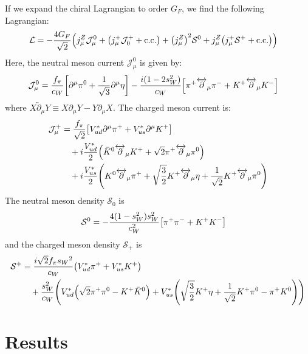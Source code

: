 \documentclass[a4paper,11pt]{article} \pdfoutput=1
\newcommand{\cL}{\mathcal{L}}
\newcommand{\cJ}{\mathcal{J}}
\newcommand{\cS}{\mathcal{S}}
\newcommand{\cw}{{c_{W}}}
\newcommand{\sw}{{s_{W}}}
\newcommand{\fpi}{{f_{\pi}}}
\newcommand{\gf}{{G_{F}}}
\newcommand{\vudc}{{V^{*}_{ud}}}
\newcommand{\vusc}{{V^{*}_{us}}}
\newcommand{\pip}{{\pi^{+}}}
\newcommand{\kp}{{K^{+}}}
\begin{document}
If we expand the chiral Lagrangian to order \(\gf\), we find the following Lagrangian:
\begin{align}
	\cL & =
	-\frac{4G_{F}}{\sqrt{2}}\qty(
	j^{Z}_{\mu}\cJ^{0}_{\mu}
	+ \qty(j^{+}_{\mu}\cJ^{+}_{0} + \mathrm{c.c.})
	+\qty(j^{Z}_{\mu})^{2}\cS^{0}
	+j^{Z}_{\mu}\qty(j^{+}_{\mu}\cS^{+}+\mathrm{c.c.})
	)
\end{align}
Here, the neutral meson current \(\cJ^{0}_{\mu}\) is given by:
\begin{align}
	\cJ^{0}_{\mu} & =
	\frac{f_{\pi}}{c_{W}}\qty[
		\partial^{\mu}\pi^{0}
		+ \frac{1}{\sqrt{3}}
		\partial^{\mu}\eta
	]
	- \frac{i (1-2s_{W}^{2})}{c_{W}}
	\qty[
	\pi^{+}\overleftrightarrow{\partial}_{\mu}\pi^{-} +
	K^{+}\overleftrightarrow{\partial}_{\mu}K^{-}
	]
\end{align}
where \(X\overleftrightarrow{\partial}_{\mu}Y \equiv X\partial_{\mu}Y - Y\partial_{\mu}X\).
The charged meson current is:
\begin{align}
	\cJ^{+}_{\mu}
	 & =
	\frac{f_{\pi}}{\sqrt{2}}\qty[
	V^{*}_{ud}\partial^{\mu}\pi^{+}
	+ V^{*}_{us}\partial^{\mu}K^{+}
	]
	\\
	 & \quad
	+ i
	\frac{V^{*}_{ud}}{2}\qty(
	\bar{K}^{0}\overleftrightarrow{\partial}_{\mu}K^{+}
	+ \sqrt{2}\pi^{+}\overleftrightarrow{\partial}_{\mu}\pi^{0}
	)\notag  \\
	 & \quad
	+i\frac{V_{us}^{*}}{2}\qty(
	K^{0}\overleftrightarrow{\partial}_{\mu}\pi^{+}
	+\sqrt{\frac{3}{2}}K^{+}\overleftrightarrow{\partial}_{\mu}\eta
	+\frac{1}{\sqrt{2}}K^{+}\overleftrightarrow{\partial}_{\mu}\pi^{0}
	)\notag
\end{align}
The neutral meson density \(\cS_{0}\) is
\begin{align}
	\cS^{0} & =
	- \frac{4(1-s_{W}^{2})s_{W}^{2}}{c_{W}^{2}}
	\qty[
	\pi^{+}\pi^{-} +
	K^{+}K^{-}
	]
\end{align}
and the charged meson density \(\cS_{+}\) is
\begin{align}
	\cS^{+}
	 & =
	\frac{i\sqrt{2}\fpi\sw^2}{\cw}\qty(\vudc\pip + \vusc\kp) \\
	 & \quad
	+ \frac{s_{W}^{2}}{c_{W}}\qty(
	V^{*}_{ud}\qty(
	\sqrt{2}\pi^{+}\pi^{0}
	- K^{+}\bar{K}^{0}
	)
	+V^{*}_{us}\qty(
	\sqrt{\frac{3}{2}}K^{+}\eta
	+ \frac{1}{\sqrt{2}}K^{+}\pi^{0}
	- \pi^{+}K^{0}
	)
	)\notag
\end{align}


\section{Results}\label{sec:results}
\end{document}
